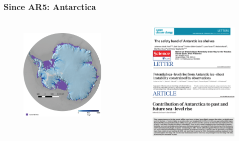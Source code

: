 \documentclass[hide notes,intlimits]{beamer}
\begin{document}
\begin{frame}
  \frametitle{Since AR5: Antarctica}
  \begin{columns}[c]
    \begin{column}{.4\linewidth}
      \begin{figure}
        \includegraphics[height=5cm]{ant-shelves}
      \end{figure}
    \end{column}
    \begin{column}{.6\linewidth}
      \begin{figure}
        \includegraphics[width=5cm]{recent-ant-pubs}
      \end{figure}
    \end{column}
  \end{columns}
\end{frame}
\end{document}
